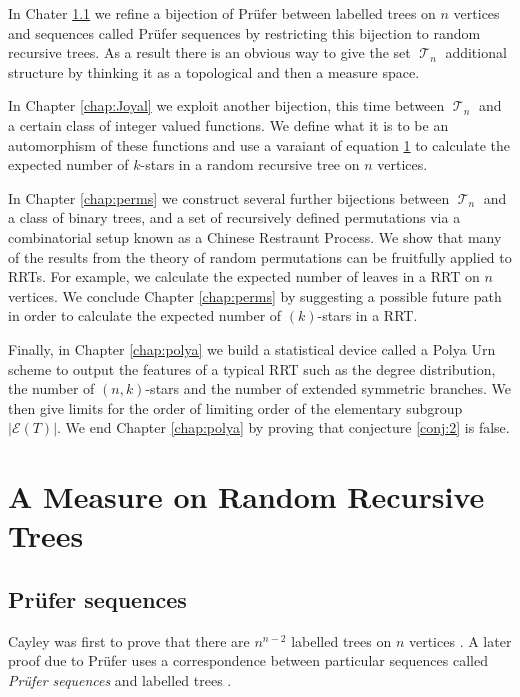 \documentclass[oneside]{book} %
\theoremstyle{definition}
\numberwithin{equation}{section}
\DeclareMathOperator{\T}{\mathcal{T}}
\begin{document}
In Chater \ref{sec:Prufer} we refine a bijection of Pr\"{u}fer between labelled trees on $n$ vertices and sequences called Pr\"{u}fer
 sequences by restricting this bijection to random recursive trees.  As a result there is an obvious way to give the set $\T_n$ 
 additional structure by thinking it as a topological and then a measure space.
 
In Chapter \ref{chap:Joyal} we exploit another bijection, this time between $\T_n$ and a certain class of integer valued 
functions.  We define what it is to be an automorphism of these functions and use a varaiant of equation \ref{} to calculate the 
expected number of $k$-stars in a random recursive tree on $n$ vertices.

In Chapter \ref{chap:perms} we construct several further bijections between $\T_n$ and a class of binary trees, and a set of 
recursively defined permutations via a combinatorial setup known as a Chinese Restraunt Process.  We show that many of the results 
from the theory of random permutations can be fruitfully applied to RRTs.  For example, we calculate the expected number of leaves in
a RRT on $n$ vertices. We conclude Chapter \ref{chap:perms} by suggesting a possible future path in order to calculate the
expected number of $(k)$-stars in a RRT. 

Finally, in Chapter \ref{chap:polya} we build a statistical device called a Polya Urn scheme to output the features of a typical 
RRT such as the degree distribution, the number of $(n,k)$-stars and the number of extended symmetric branches.  We then give limits
 for the order of limiting order of the elementary subgroup $\lvert \mathcal{E}(T) \rvert$.  We end Chapter \ref{chap:polya}  by 
 proving that conjecture \ref{conj:2} is false. 

\chapter{A Measure on Random Recursive Trees}

\section{Pr\"{ufer} sequences}\label{sec:Prufer}

Cayley was first to prove that there are $n^{n-2}$ labelled trees on $n$ vertices \cite{Cayley}. A later proof due 
to Pr\"{u}fer uses a correspondence between particular sequences called \emph{Pr\"{u}fer sequences} and labelled trees 
\cite{Bela}.  
\end{document}
